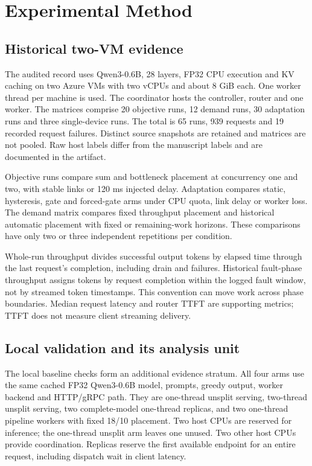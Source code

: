 \documentclass[conference]{IEEEtran}
\begin{document}
\hypertarget{experimental-method}{%
\section{Experimental Method}\label{experimental-method}}

\hypertarget{historical-two-vm-evidence}{%
\subsection{Historical two-VM
evidence}\label{historical-two-vm-evidence}}

The audited record uses Qwen3-0.6B, 28 layers, FP32 CPU execution and KV
caching on two Azure VMs with two vCPUs and about 8 GiB each. One worker
thread per machine is used. The coordinator hosts the controller, router
and one worker. The matrices comprise 20 objective runs, 12 demand runs,
30 adaptation runs and three single-device runs. The total is 65 runs,
939 requests and 19 recorded request failures. Distinct source snapshots
are retained and matrices are not pooled. Raw host labels differ from
the manuscript labels and are documented in the artifact.

Objective runs compare sum and bottleneck placement at concurrency one
and two, with stable links or 120 ms injected delay. Adaptation compares
static, hysteresis, gate and forced-gate arms under CPU quota, link
delay or worker loss. The demand matrix compares fixed throughput
placement and historical automatic placement with fixed or
remaining-work horizons. These comparisons have only two or three
independent repetitions per condition.

Whole-run throughput divides successful output tokens by elapsed time
through the last request's completion, including drain and failures.
Historical fault-phase throughput assigns tokens by request completion
within the logged fault window, not by streamed token timestamps. This
convention can move work across phase boundaries. Median request latency
and router TTFT are supporting metrics; TTFT does not measure client
streaming delivery.

\hypertarget{local-validation-and-its-analysis-unit}{%
\subsection{Local validation and its analysis
unit}\label{local-validation-and-its-analysis-unit}}

The local baseline checks form an additional evidence stratum. All four
arms use the same cached FP32 Qwen3-0.6B model, prompts, greedy output,
worker backend and HTTP/gRPC path. They are one-thread unsplit serving,
two-thread unsplit serving, two complete-model one-thread replicas, and
two one-thread pipeline workers with fixed 18/10 placement. Two host
CPUs are reserved for inference; the one-thread unsplit arm leaves one
unused. Two other host CPUs provide coordination. Replicas reserve the
first available endpoint for an entire request, including dispatch wait
in client latency.
\end{document}
